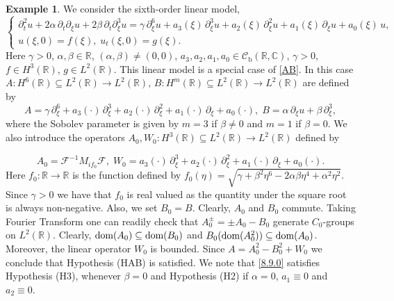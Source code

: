 \documentclass[11pt]{amsart}
\numberwithin{equation}{section}
\newcommand\R{\mathbb R}
\newcommand{\RR}{{\mathbb R}}
\newcommand{\CC}{{\mathbb C}}
\newcommand{\rmb}{{\mathrm{b}}}
\theoremstyle{remark}
\theoremstyle{definition}
\newtheorem{example}[theorem]{Example}
\newcommand\cC{{\mathcal C}}
\newcommand{\dom}{\text{\rm{dom}}}
\begin{document}
\begin{example}\label{e8.9} We consider the sixth-order linear model,
	\begin{equation}\label{8.9.0}
		\begin{cases}
			\partial_t^2 u + 2\alpha\,\partial_t\partial_\xi u + 2\beta\,\partial_t\partial_\xi^3 u
			= \gamma\,\partial_\xi^6 u + a_3(\xi)\,\partial_\xi^3 u+a_2(\xi)\,\partial_\xi^2 u+a_1(\xi)\,\partial_\xi u + a_0(\xi)\,u,\\
			u(\xi,0) = f(\xi),\; u_t(\xi,0) = g(\xi).
		\end{cases}
	\end{equation}	
	Here $\gamma>0$, $\alpha,\beta\in\RR$, $(\alpha,\beta)\ne(0,0)$, $a_3,a_2,a_1, a_0 \in \cC_\rmb(\RR,\CC)$, $\gamma > 0$,
	$f \in H^3(\R)$, $g \in L^2(\R)$. This linear model is a special case of \eqref{AB}. In this case $A:H^6(\RR)\subseteq L^2(\RR)\to L^2(\RR)$, $B:H^m(\RR)\subseteq L^2(\RR)\to L^2(\RR)$ are defined by 
	\begin{equation}\label{8.9.1}
		A=\gamma\,\partial_\xi^6 + a_3(\cdot)\,\partial_\xi^3 +a_2(\cdot)\,\partial_\xi^2 +a_1(\cdot)\,\partial_\xi  + a_0(\cdot),\;B=\alpha\,\partial_\xi u+\beta\,\partial_\xi^3,
	\end{equation}	
	where the Sobolev parameter is given by $m=3$ if $\beta\ne0$ and $m=1$ if $\beta=0$. We also introduce the operators $A_0, W_0:H^3(\RR)\subseteq L^2(\RR)\to L^2(\RR)$ defined by 
	
	\begin{equation}\label{8.9.2}
		A_0 = \mathcal{F}^{-1} M_{if_0} \mathcal{F},\;W_0=a_3(\cdot)\,\partial_\xi^3 +a_2(\cdot)\,\partial_\xi^2 +a_1(\cdot)\,\partial_\xi  + a_0(\cdot).
	\end{equation}
	Here $f_0:\R\to\R$ is the function defined by $f_0(\eta) =\sqrt{\gamma+\beta^2\eta^6-2\alpha\beta\eta^4+\alpha^2\eta^2}$. Since $\gamma>0$ we have that $f_0$ is real valued as the quantity under the square root is always non-negative. Also, we set $B_0=B$. Clearly, $A_0$ and $B_0$ commute. Taking Fourier Transform one can readily check that $A_0^\pm=\pm A_0-B_0$ generate $C_0$-groups on $L^2(\RR)$. Clearly, $\dom(A_0)\subseteq\dom(B_0)$ and $B_0(\dom(A_0^2)) \subseteq \dom(A_0)$. Moreover, the linear operator  $W_0$ is bounded. Since $A=A_0^2-B_0^2+W_0$ we conclude that Hypothesis (HAB) is satisfied. We note that \eqref{8.9.0} satisfies Hypothesis (H3), whenever $\beta=0$ and Hypothesis (H2) if $\alpha=0$, $a_1\equiv 0$ and $a_2\equiv0$.
\end{example}
\end{document}
